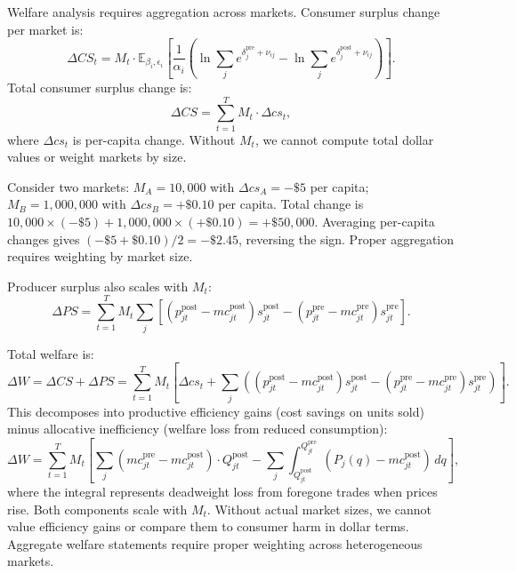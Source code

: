 \documentclass[english,11pt]{article}
\begin{document}
\begin{enumerate}
Welfare analysis requires aggregation across markets. Consumer surplus change per market is:
\[
\Delta CS_t = M_t \cdot \mathbb{E}_{\beta_i, \epsilon_i} \left[\frac{1}{\alpha_i} \left(\ln \sum_j e^{\delta_j^{\text{pre}} + \nu_{ij}} - \ln \sum_j e^{\delta_j^{\text{post}} + \nu_{ij}}\right)\right].
\]
Total consumer surplus change is:
\[
\Delta CS = \sum_{t=1}^{T} M_t \cdot \Delta cs_t,
\]
where $\Delta cs_t$ is per-capita change. Without $M_t$, we cannot compute total dollar values or weight markets by size.

Consider two markets: $M_A = 10{,}000$ with $\Delta cs_A = -\$5$ per capita; $M_B = 1{,}000{,}000$ with $\Delta cs_B = +\$0.10$ per capita. Total change is $10{,}000 \times (-\$5) + 1{,}000{,}000 \times (+\$0.10) = +\$50{,}000$. Averaging per-capita changes gives $(-\$5 + \$0.10)/2 = -\$2.45$, reversing the sign. Proper aggregation requires weighting by market size.

Producer surplus also scales with $M_t$:
\[
\Delta PS = \sum_{t=1}^{T} M_t \sum_{j} \left[(p_{jt}^{\text{post}} - mc_{jt}^{\text{post}}) s_{jt}^{\text{post}} - (p_{jt}^{\text{pre}} - mc_{jt}^{\text{pre}}) s_{jt}^{\text{pre}}\right].
\]

Total welfare is:
\[
\Delta W = \Delta CS + \Delta PS = \sum_{t=1}^{T} M_t \left[\Delta cs_t + \sum_{j} \left((p_{jt}^{\text{post}} - mc_{jt}^{\text{post}}) s_{jt}^{\text{post}} - (p_{jt}^{\text{pre}} - mc_{jt}^{\text{pre}}) s_{jt}^{\text{pre}}\right)\right].
\]
This decomposes into productive efficiency gains (cost savings on units sold) minus allocative inefficiency (welfare loss from reduced consumption):
\[
\Delta W = \sum_{t=1}^{T} M_t \left[\sum_j (mc_{jt}^{\text{pre}} - mc_{jt}^{\text{post}}) \cdot Q_{jt}^{\text{post}} - \sum_j \int_{Q_{jt}^{\text{post}}}^{Q_{jt}^{\text{pre}}} (P_j(q) - mc_{jt}^{\text{post}}) \, dq\right],
\]
where the integral represents deadweight loss from foregone trades when prices rise. Both components scale with $M_t$. Without actual market sizes, we cannot value efficiency gains or compare them to consumer harm in dollar terms. Aggregate welfare statements require proper weighting across heterogeneous markets.



\end{enumerate}
\end{document}

